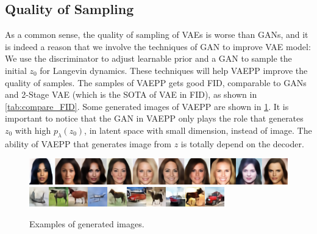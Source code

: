 \subsection{Quality of Sampling}
As a common sense, the quality of sampling of VAEs is worse than GANs, and it is indeed a reason that we involve the techniques of GAN to improve VAE model: We use the discriminator to adjust learnable prior and a GAN to sample the initial $z_0$ for Langevin dynamics. These techniques will help VAEPP improve the quality of samples. The samples of VAEPP gets good FID, comparable to GANs and 2-Stage VAE (which is the SOTA of VAE in FID), as shown in \cref{tab:compare_FID}. Some generated images of VAEPP are shown in \cref{fig:show_images}. 
It is important to notice that the GAN in VAEPP only plays the role that generates $z_0$ with high $p_\lambda(z_0)$, in latent space with small dimension, instead of image. The ability of VAEPP that generates image from $z$ is totally depend on the decoder. 
\begin{figure}[tb]
	\centering
	\includegraphics[width=1.0\columnwidth]{../figures/celeba}
	\includegraphics[width=1.0\columnwidth]{../figures/cifar}
	\caption{
		Examples of generated images.
	}
	\label{fig:show_images}
\end{figure}
